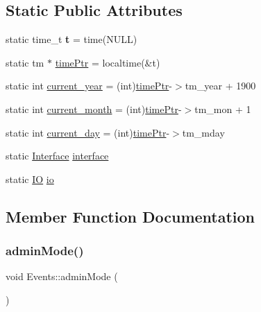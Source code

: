 \subsection*{Static Public Attributes}
\begin{DoxyCompactItemize}
\item 
\mbox{\label{classEvents_aade17141a5113ddb6f5c6c01afd520c9}} 
static time\+\_\+t {\bfseries t} = time(N\+U\+LL)
\item 
static tm $\ast$ \hyperlink{classEvents_ad5ad3f8eb6f5d0875ab7a74fb2bb06e5}{time\+Ptr} = localtime(\&t)
\item 
static int \hyperlink{classEvents_a772f653c845f4eedf58ba446b7fee45a}{current\+\_\+year} = (int)\hyperlink{classEvents_ad5ad3f8eb6f5d0875ab7a74fb2bb06e5}{time\+Ptr}-\/$>$tm\+\_\+year + 1900
\item 
static int \hyperlink{classEvents_a8a522493c1697161ca70c39232c7464b}{current\+\_\+month} = (int)\hyperlink{classEvents_ad5ad3f8eb6f5d0875ab7a74fb2bb06e5}{time\+Ptr}-\/$>$tm\+\_\+mon + 1
\item 
static int \hyperlink{classEvents_acd42b7f13cdfc41a0a6c3c6fb399da2a}{current\+\_\+day} = (int)\hyperlink{classEvents_ad5ad3f8eb6f5d0875ab7a74fb2bb06e5}{time\+Ptr}-\/$>$tm\+\_\+mday
\item 
static \hyperlink{classInterface}{Interface} \hyperlink{classEvents_a397cb3524ec70d64e22144c12d53edda}{interface}
\item 
static \hyperlink{classIO}{IO} \hyperlink{classEvents_a7b8a2caf783b96de00de01145a8763d2}{io}
\end{DoxyCompactItemize}


\subsection{Member Function Documentation}
\mbox{\label{classEvents_a2217e32868e367ec8d432ce9db2b450e}} 
\subsubsection{\texorpdfstring{admin\+Mode()}{adminMode()}}
{\footnotesize\ttfamily void Events\+::admin\+Mode (\begin{DoxyParamCaption}{ }\end{DoxyParamCaption})\hspace{0.3cm}{\ttfamily [static]}}

